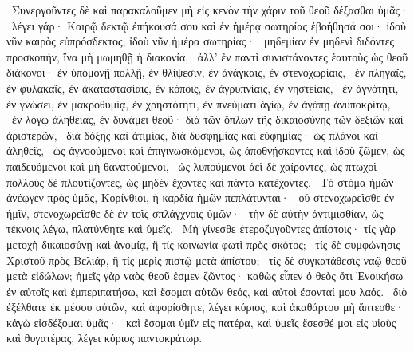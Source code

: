 ~Συνεργοῦντες δὲ καὶ παρακαλοῦμεν μὴ εἰς κενὸν τὴν χάριν τοῦ θεοῦ δέξασθαι ὑμᾶς·
~λέγει γάρ· Καιρῷ δεκτῷ ἐπήκουσά σου καὶ ἐν ἡμέρᾳ σωτηρίας ἐβοήθησά σοι· ἰδοὺ νῦν καιρὸς εὐπρόσδεκτος, ἰδοὺ νῦν ἡμέρα σωτηρίας·
~μηδεμίαν ἐν μηδενὶ διδόντες προσκοπήν, ἵνα μὴ μωμηθῇ ἡ διακονία,
~ἀλλ’ ἐν παντὶ συνιστάνοντες ἑαυτοὺς ὡς θεοῦ διάκονοι· ἐν ὑπομονῇ πολλῇ, ἐν θλίψεσιν, ἐν ἀνάγκαις, ἐν στενοχωρίαις,
~ἐν πληγαῖς, ἐν φυλακαῖς, ἐν ἀκαταστασίαις, ἐν κόποις, ἐν ἀγρυπνίαις, ἐν νηστείαις,
~ἐν ἁγνότητι, ἐν γνώσει, ἐν μακροθυμίᾳ, ἐν χρηστότητι, ἐν πνεύματι ἁγίῳ, ἐν ἀγάπῃ ἀνυποκρίτῳ,
~ἐν λόγῳ ἀληθείας, ἐν δυνάμει θεοῦ· διὰ τῶν ὅπλων τῆς δικαιοσύνης τῶν δεξιῶν καὶ ἀριστερῶν,
~διὰ δόξης καὶ ἀτιμίας, διὰ δυσφημίας καὶ εὐφημίας· ὡς πλάνοι καὶ ἀληθεῖς,
~ὡς ἀγνοούμενοι καὶ ἐπιγινωσκόμενοι, ὡς ἀποθνῄσκοντες καὶ ἰδοὺ ζῶμεν, ὡς παιδευόμενοι καὶ μὴ θανατούμενοι,
~ὡς λυπούμενοι ἀεὶ δὲ χαίροντες, ὡς πτωχοὶ πολλοὺς δὲ πλουτίζοντες, ὡς μηδὲν ἔχοντες καὶ πάντα κατέχοντες.
~Τὸ στόμα ἡμῶν ἀνέῳγεν πρὸς ὑμᾶς, Κορίνθιοι, ἡ καρδία ἡμῶν πεπλάτυνται·
~οὐ στενοχωρεῖσθε ἐν ἡμῖν, στενοχωρεῖσθε δὲ ἐν τοῖς σπλάγχνοις ὑμῶν·
~τὴν δὲ αὐτὴν ἀντιμισθίαν, ὡς τέκνοις λέγω, πλατύνθητε καὶ ὑμεῖς.
~Μὴ γίνεσθε ἑτεροζυγοῦντες ἀπίστοις· τίς γὰρ μετοχὴ δικαιοσύνῃ καὶ ἀνομίᾳ, ἢ τίς κοινωνία φωτὶ πρὸς σκότος;
~τίς δὲ συμφώνησις Χριστοῦ πρὸς Βελιάρ, ἢ τίς μερὶς πιστῷ μετὰ ἀπίστου;
~τίς δὲ συγκατάθεσις ναῷ θεοῦ μετὰ εἰδώλων; ἡμεῖς γὰρ ναὸς θεοῦ ἐσμεν ζῶντος· καθὼς εἶπεν ὁ θεὸς ὅτι Ἐνοικήσω ἐν αὐτοῖς καὶ ἐμπεριπατήσω, καὶ ἔσομαι αὐτῶν θεός, καὶ αὐτοὶ ἔσονταί μου λαός.
~διὸ ἐξέλθατε ἐκ μέσου αὐτῶν, καὶ ἀφορίσθητε, λέγει κύριος, καὶ ἀκαθάρτου μὴ ἅπτεσθε· κἀγὼ εἰσδέξομαι ὑμᾶς·
~καὶ ἔσομαι ὑμῖν εἰς πατέρα, καὶ ὑμεῖς ἔσεσθέ μοι εἰς υἱοὺς καὶ θυγατέρας, λέγει κύριος παντοκράτωρ.

